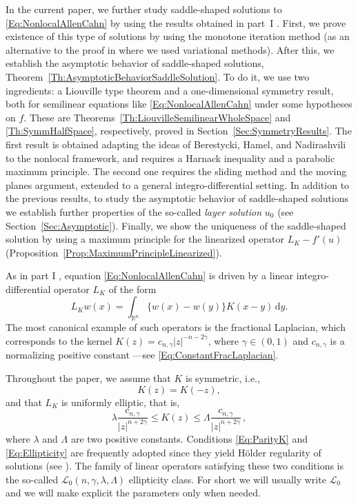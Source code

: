 \documentclass[12pt,reqno]{amsart}
\theoremstyle{definition}
\theoremstyle{remark}
\newcommand{\con}[1]{\mathbb{#1}}
\newcommand{\R}{\con{R}} %
\newcommand{\lcal}{\mathcal{L}}
\newcommand{\s}{\gamma}
\renewcommand{\d}{\,\mathrm{d}} %
\numberwithin{equation}{section}
\begin{document}
In the current paper, we further study saddle-shaped solutions to \eqref{Eq:NonlocalAllenCahn} by using the results obtained in part~I \cite{FelipeSanz-Perela:IntegroDifferentialI}. First, we prove existence of this type of solutions by using the monotone iteration method (as an alternative to the proof in \cite{FelipeSanz-Perela:IntegroDifferentialI} where we used variational methods). After this, we establish the asymptotic behavior of saddle-shaped solutions,  Theorem~\ref{Th:AsymptoticBehaviorSaddleSolution}. To do it, we use two ingredients: a Liouville type theorem and a one-dimensional symmetry result, both for semilinear equations like \eqref{Eq:NonlocalAllenCahn} under some hypotheses on $f$. These are Theorems~\ref{Th:LiouvilleSemilinearWholeSpace} and \ref{Th:SymmHalfSpace}, respectively, proved in Section~\ref{Sec:SymmetryResults}. The first result is obtained adapting the ideas of Berestycki, Hamel, and Nadirashvili \cite{BerestyckiHamelNadi} to the nonlocal framework, and requires a Harnack inequality and a parabolic maximum principle. The second one requires the sliding method and the moving planes argument, extended to a general integro-differential setting. In addition to the previous results, to study the asymptotic behavior of saddle-shaped solutions we establish further properties of the so-called \emph{layer solution} $u_0$ (see Section~\ref{Sec:Asymptotic}). Finally, we show the uniqueness of the saddle-shaped solution by using a maximum principle for the linearized operator $L_K - f'(u)$ (Proposition~\ref{Prop:MaximumPrincipleLinearized}).

As in part I \cite{FelipeSanz-Perela:IntegroDifferentialI}, equation \eqref{Eq:NonlocalAllenCahn} is driven by a linear integro-differential operator $L_K$ of the form
\begin{equation}
\label{Eq:DefOfLu}
L_K w(x) = \int_{\R^n} \{w(x) - w(y)\} K(x-y)\d y.
\end{equation}
The most canonical example of such operators is the fractional Laplacian, which corresponds to the kernel $K(z) = c_{n, \s} |z|^{-n-2\s}$, where $\s \in (0,1)$ and $c_{n, \s}$ is a normalizing positive constant ---see \eqref{Eq:ConstantFracLaplacian}.

Throughout the paper, we assume that $K$ is symmetric, i.e.,
\begin{equation}
\label{Eq:ParityK}
K(z) = K(-z),
\end{equation}
and that $L_K$ is uniformly elliptic, that is,
\begin{equation}
\label{Eq:Ellipticity}
\lambda \dfrac{c_{n,\s}}{|z|^{n+2\s}} \leq K(z) \leq \Lambda \dfrac{c_{n,\s}}{|z|^{n+2\s}}\,, 
\end{equation}
where $\lambda$ and $\Lambda$ are two positive constants. Conditions \eqref{Eq:ParityK} and \eqref{Eq:Ellipticity} are frequently adopted since they yield Hölder regularity of solutions (see \cite{RosOton-Survey,SerraC2s+alphaRegularity}). The family of linear operators satisfying these two conditions is the so-called $\lcal_0(n,\s,\lambda, \Lambda)$ ellipticity class. For short we will usually write $\lcal_0$ and we will make explicit the parameters only when needed. 
\end{document}
